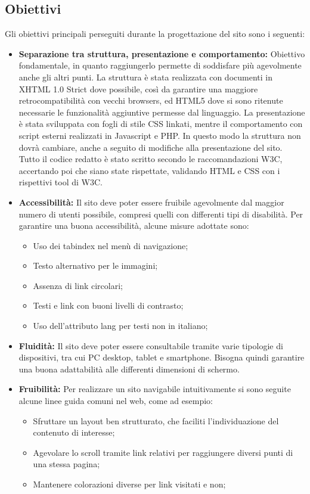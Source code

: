\documentclass{article}
\begin{document}
		\subsection{Obiettivi}
		    Gli obiettivi principali perseguiti durante la progettazione del sito sono i seguenti:
		    \begin{itemize}
		        \item \textbf{Separazione tra struttura, presentazione e comportamento:}
		        Obiettivo fondamentale, in quanto raggiungerlo permette di soddisfare più agevolmente anche gli altri punti. 
		        La struttura è stata realizzata con documenti in XHTML 1.0 Strict dove possibile, così da garantire una maggiore retrocompatibilità con vecchi browsers, ed HTML5 dove si sono ritenute necessarie le funzionalità aggiuntive permesse dal linguaggio. 
		        La presentazione è stata sviluppata con fogli di stile CSS linkati, mentre il comportamento con script esterni realizzati in Javascript e PHP. In questo modo la struttura non dovrà cambiare, anche a seguito di modifiche alla presentazione del sito.
		        Tutto il codice redatto è stato scritto secondo le raccomandazioni W3C, accertando poi che siano state rispettate, validando HTML e CSS con i rispettivi tool di W3C.
		        \item \textbf{Accessibilità:}
		        Il sito deve poter essere fruibile agevolmente dal maggior numero di utenti possibile, compresi quelli con differenti tipi di disabilità. Per garantire una buona accessibilità, alcune misure adottate sono:
		        \begin{itemize}
		            \item Uso dei tabindex nel menù di navigazione;
		            \item Testo alternativo per le immagini;
		            \item Assenza di link circolari;
		            \item Testi e link con buoni livelli di contrasto;
		            \item Uso dell'attributo lang per testi non in italiano;
		        \end{itemize}
		        \item \textbf{Fluidità:}
		        Il sito deve poter essere consultabile tramite varie tipologie di dispositivi, tra cui PC desktop, tablet e smartphone. Bisogna quindi garantire una buona adattabilità alle differenti dimensioni di schermo.
		        \item \textbf{Fruibilità:}
		        Per realizzare un sito navigabile intuitivamente si sono seguite alcune linee guida comuni nel web, come ad esempio:
		        \begin{itemize}
		            \item Sfruttare un layout ben strutturato, che faciliti l'individuazione del contenuto di interesse;
		            \item Agevolare lo scroll tramite link relativi per raggiungere diversi punti di una stessa pagina;
		            \item Mantenere colorazioni diverse per link visitati e non;
		        \end{itemize}
		    \end{itemize}
\end{document}
